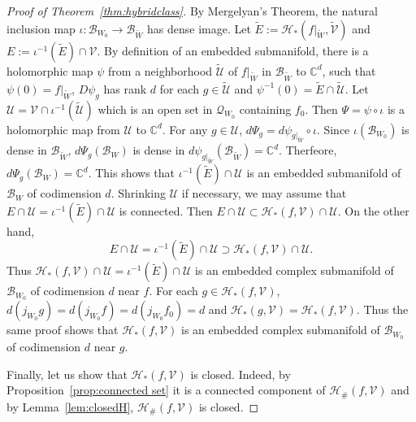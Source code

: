 \documentclass{amsart}
\numberwithin{equation}{section}
\newcommand{\C}{\mathbb C}
\theoremstyle{definition}
\theoremstyle{remark}
\begin{document}
\begin{proof} [Proof of Theorem~\ref{thm:hybridclass}]
By Mergelyan's Theorem, the natural inclusion map $\iota:\mathcal{B}_{W_0}\to \mathcal{B}_{\widetilde{W}}$ has dense image.  Let $\widetilde{E}:=\mathcal{H}_*(f|_{\widetilde{W}},\widetilde{\mathcal{V}})$ and $E:=\iota^{-1}(\widetilde{E})\cap \mathcal{V}$. By definition of an embedded submanifold, there is a holomorphic map $\psi$ from a neighborhood $\widetilde{\mathcal{U}}$ of $f|_{\widetilde{W}}$ in $\mathcal{B}_{\widetilde{W}}$ to $\C^d$, such that $\psi(0)=f|_{\widetilde{W}}$, $D\psi_g$ has rank $d$ for each $g\in \widetilde{\mathcal{U}}$ and $\psi^{-1}(0)=\widetilde{E}\cap \widetilde{\mathcal{U}}$. Let $\mathcal{U}=\mathcal{V}\cap \iota^{-1}(\widetilde{\mathcal{U}})$ which is an open set in $\mathcal{Q}_{W_0}$ containing $f_0$. Then $\Psi=\psi\circ \iota$ is a holomorphic map from $\mathcal{U}$ to $\C^d$. For any $g
\in \mathcal{U}$, $d\Psi_g=d\psi_{g|_{\widetilde{W}}} \circ \iota$. 
Since $\iota(\mathcal{B}_{W_0})$ is dense in $\mathcal{B}_{\widetilde{W}}$, $d\Psi_g(\mathcal{B}_W)$ is dense in $d\psi_{g|_{\widetilde{W}}}(\mathcal{B}_{\widetilde{W}})=\C^d$. Therfeore, $d\Psi_g(\mathcal{B}_W)=\C^d$. This shows that $\iota^{-1}(\widetilde{E})\cap \mathcal{U}$ is an embedded submanifold of $\mathcal{B}_W$ of codimension $d$. Shrinking $\mathcal{U}$ if necessary, we may assume that $E\cap \mathcal{U}=\iota^{-1}(\widetilde{E})\cap\mathcal{U}$ is connected. Then $E\cap \mathcal{U}\subset \mathcal{H}_*(f,\mathcal{V})\cap \mathcal{U}$. On the other hand,
$$E\cap\mathcal{U}=\iota^{-1}(\widetilde{E})\cap \mathcal{U}\supset \mathcal{H}_*(f, \mathcal{V})\cap \mathcal{U}.$$
Thus $\mathcal{H}_*(f,\mathcal{V})\cap \mathcal{U}=\iota^{-1}(\widetilde{E})\cap \mathcal{U}$ is an embedded complex submanifold of $\mathcal{B}_{W_0}$ of codimension $d$ near $f$. For each $g\in \mathcal{H}_*(f,\mathcal{V})$, $d(j_{W_0}g)=d(j_{W_0}f)=d(j_{W_0}f_0)=d$ and $\mathcal{H}_*(g,\mathcal{V})=\mathcal{H}_*(f,\mathcal{V})$. Thus the same proof shows that $\mathcal{H}_*(f,\mathcal{V})$ is  an embedded complex submanifold of $\mathcal{B}_{W_0}$ of codimension $d$ near $g$. 

Finally, let us show that $\mathcal{H}_*(f,\mathcal{V})$ is closed.  
Indeed, by Proposition~\ref{prop:connected set} it is a connected component of 
$\mathcal{H}_\#(f,\mathcal{V})$ and by Lemma~\ref{lem:closedH}, $\mathcal{H}_\#(f,\mathcal{V})$ is closed. 
\end{proof}
\end{document}
